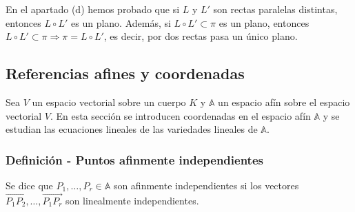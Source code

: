 \documentclass[12pt, a4paper, ones, notitlepage, openany,titlepage]{article}
\begin{document}
En el apartado (d) hemos probado que si $L$ y $L'$ son rectas paralelas distintas, entonces $L \circ L'$ es un plano. Además, si $L \circ L' \subset \pi$ es un plano, entonces $L \circ L' \subset \pi \Longrightarrow \pi = L \circ L'$, es decir, por dos rectas pasa un único plano.

\subsection{Referencias afines y coordenadas}
Sea $V$ un espacio vectorial sobre un cuerpo $K$ y $\mathbb{A}$ un espacio afín sobre el espacio vectorial $V$. En esta sección se introducen coordenadas en el espacio afín $\mathbb{A}$ y se estudian las ecuaciones lineales de las variedades lineales de $\mathbb{A}$.

\subsubsection{Definición - Puntos afinmente independientes}
Se dice que $P_{1}, \ldots, P_{r} \in \mathbb{A}$ son afinmente independientes si los vectores $\overrightarrow{P_{1} P_{2}}, \ldots, \overrightarrow{P_{1} P_{r}}$ son linealmente independientes.
\end{document}
